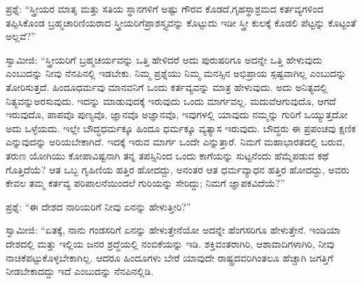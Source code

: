 \vskip 5pt

ಪ್ರಶ್ನೆ: “ಸ್ತ್ರೀಯರ ಮಾತೃ ಮತ್ತು ಸತಿಯ ಸ್ಥಾನಗಳಿಗೆ ಅಷ್ಟು ಗೌರವ ಕೊಡದೆ,\break ಗೃಹಸ್ಥಾಶ್ರಮದ ಕರ್ತವ್ಯಗಳಿಂದ ತಪ್ಪಿಸಿಕೊಂಡ ಬ್ರಹ್ಮಚಾರಿಣಿಯರಾದ ಸ್ತ್ರೀಯರಿಗೆ\break ಪ್ರಾಶಸ್ತ್ಯವನ್ನು ಕೊಟ್ಟುದು ಇಡೀ ಸ್ತ್ರೀ ಕುಲಕ್ಕೆ ಕೊಡಲಿ ಪೆಟ್ಟನ್ನು ಕೊಟ್ಟಂತೆ ಅಲ್ಲವೆ?”

\vskip 5pt

ಸ್ವಾಮೀಜಿ: “ಸ್ತ್ರೀಯರಿಗೆ ಬ್ರಹ್ಮಚರ್ಯವನ್ನು ಒತ್ತಿ ಹೇಳಿದರೆ ಅದು ಪುರುಷರಿಗೂ ಅದನ್ನೇ ಒತ್ತಿ ಹೇಳುವುದು ಎಂಬುದನ್ನು ನೀವು ನೆನಪಿನಲ್ಲಿ ಇಡಬೇಕು. ನಿಮ್ಮ ಪ್ರಶ್ನೆಯು ನಿಮ್ಮ ಮನಸ್ಸಿನ ಅಭಿಪ್ರಾಯ ಸ್ಪಷ್ಟವಾಗಿಲ್ಲ ಎಂಬುದನ್ನು ತೋರಿಸುತ್ತದೆ. ಹಿಂದೂಧರ್ಮವು ಮಾನವನಿಗೆ ಒಂದು ಕರ್ತವ್ಯವನ್ನು ಮಾತ್ರ ಹೇಳುವುದು. ಅದು ಅನಿತ್ಯದಲ್ಲಿ ನಿತ್ಯವನ್ನು\break ಅರಸುವುದು. ಇದನ್ನು ಮಾಡುವುದಕ್ಕೆ ಇರುವುದು ಒಂದು ಮಾರ್ಗವಲ್ಲ. ಮದುವೆ\break ಆಗುವುದೊ, ಆಗದೆ ಇರುವುದೊ, ಪಾಪವೊ ಪುಣ್ಯವೊ, ಜ್ಞಾನವೊ ಅಜ್ಞಾನವೊ, ಇವುಗಳಲ್ಲಿ ಯಾವುದು ನಮ್ಮನ್ನು ಗುರಿಗೆ ಒಯ್ಯುತ್ತದೋ ಅದು ಒಳ್ಳೆಯದು. ಇಲ್ಲೇ ಬೌದ್ಧಧರ್ಮಕ್ಕೂ ಹಿಂದೂ ಧರ್ಮಕ್ಕೂ ವ್ಯತ್ಯಾಸ ಇರುವುದು. ಬೌದ್ಧರು ಈ ಪ್ರಪಂಚವು ಕ್ಷಣಿಕ ಎನ್ನುವುದನ್ನು ಅರಿಯಬೇಕಾಗಿದೆ. ಇದಕ್ಕೆ ಇರುವ ಮಾರ್ಗ ಒಂದೇ ಎನ್ನುತ್ತಾರೆ. ನಿಮಗೆ ಮಹಾಭಾರತದಲ್ಲಿ ಬರುವ, ತರುಣ ಯೋಗಿಯು ಕೋಪಾವಿಷ್ಟನಾಗಿ ತನ್ನ ತಪಸ್ಸಿನಿಂದ ಒಂದು ಕಾಗೆಯನ್ನು ಸುಟ್ಟನೆಂದು ಹೆಮ್ಮೆಪಡುವ ಕಥೆ ಗೊತ್ತಿದೆಯೆ? ಆತ ಒಬ್ಬ ಗೃಹಿಣಿಯ ಹತ್ತಿರ ಹೋದದ್ದು, ಅನಂತರ ಆತ ಧರ್ಮವ್ಯಾಧನ ಹತ್ತಿರ ಹೋದದ್ದು, ಅವರು ಕೇವಲ ತಮ್ಮ ಕರ್ತವ್ಯ ಪರಿಪಾಲನೆಯಿಂದಲೆ ಗುರಿಯನ್ನು ಸೇರಿದ್ದು; ನಿಮಗೆ ಜ್ಞಾಪಕವಿದೆಯೆ?”

\vskip 5pt

ಪ್ರಶ್ನೆ: “ಈ ದೇಶದ ನಾರಿಯರಿಗೆ ನೀವು ಏನನ್ನು ಹೇಳುತ್ತೀರಿ?”

\vskip 5pt

ಸ್ವಾಮೀಜಿ: “ಏತಕ್ಕೆ, ನಾನು ಗಂಡಸರಿಗೆ ಏನನ್ನು ಹೇಳುತ್ತೇನೆಯೋ ಅದನ್ನೇ ಹೆಂಗಸರಿಗೂ ಹೇಳುತ್ತೇನೆ. ಇಂಡಿಯಾ ದೇಶದಲ್ಲಿ ಮತ್ತು ಇಲ್ಲಿಯ ಜನರ ಶ್ರದ್ಧೆಯಲ್ಲಿ ನಂಬಿಕೆಯನ್ನು ಇಡಿ. ಶಕ್ತಿವಂತರಾಗಿರಿ, ಆಶಾವಾದಿಗಳಾಗಿರಿ, ನೀವು ನಾಚಿಕೆಪಟ್ಟುಕೊಳ್ಳಬೇಕಾಗಿಲ್ಲ. ಆದರೂ ಹಿಂದೂಗಳು ಬೇರೆ ಯಾವುದೇ ರಾಷ್ಟ್ರದವರಿಗಿಂತಲೂ ಹೆಚ್ಚಾಗಿ ಜಗತ್ತಿಗೆ ನೀಡಬೇಕಾದದ್ದು ಇದೆ ಎಂಬುದನ್ನು ನೆನಪಿನಲ್ಲಿಡಿ.

